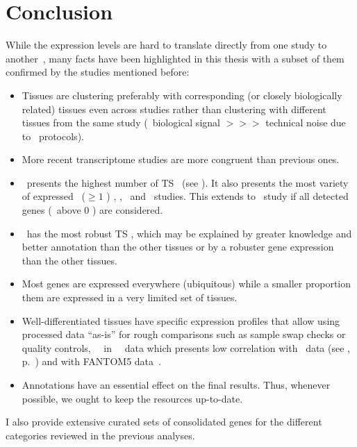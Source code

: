 \section{Conclusion}
While the expression levels are hard to translate directly from one study
to another~,
many facts have been highlighted in this thesis with a subset of them confirmed
by the studies mentioned before:%
\begin{itemize}[nosep,topsep=0pt]
        \item Tissues are clustering preferably with corresponding
            (or closely biologically related) tissues even across studies
            rather than clustering with different tissues from the same study
            (\ie\ biological signal $>>>$ technical noise due to \Rnaseq\ protocols).
        \item More recent transcriptome studies are more congruent than previous ones.
        \item \testis\ presents the highest number of \gls{TS} \pcgs\
            (see ).
            It also presents the most variety of expressed \pcgs\ ($≥1$ \FPKM)
            \castle, \brawand, \ibm\ and \uhlen\ studies.
            This extends to \gtex\ study if all detected genes (\ie\ above 0 \FPKM)
            are considered.
        \item \liver\ has the most robust \gls{TS} \pcgs,
            which may be explained by greater knowledge
            and better annotation than the other tissues
            or by a robuster gene expression than the other tissues.
        \item Most genes are expressed everywhere (ubiquitous) while
          a smaller proportion them are expressed in a very limited set of tissues.
        \item Well-differentiated tissues have specific expression profiles
            that allow using processed data \enquote{as-is} for rough comparisons
            such as sample swap checks
            or quality controls, \eg\ \salivary\ in \uhlen\ \etal\ data which
            presents low correlation with
            \gtex\ data (see ,
            p.~\pageref{fig:SamedistribPearsCorr}) and with
            FANTOM5 data~.
        \item Annotations have an essential effect on the final results.
              Thus, whenever possible, we ought to keep the resources up-to-date.
\end{itemize}
\vspace{-1.7mm}
I also provide extensive curated sets of consolidated genes
for the different categories reviewed in the previous analyses.
\vspace{-1.5mm}

